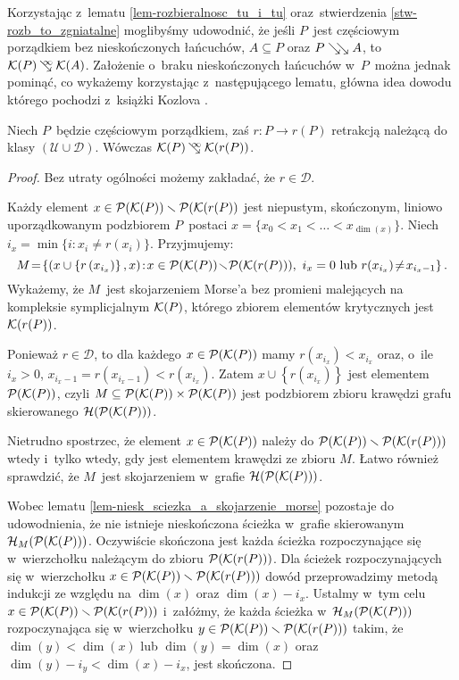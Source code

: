 Korzystając z~lematu \ref{lem-rozbieralnosc_tu_i_tu} oraz~stwierdzenia \ref{stw-rozb_to_zgniatalne} moglibyśmy udowodnić, że jeśli $P$~jest częściowym porządkiem bez nieskończonych łańcuchów, $A\subseteq P$ oraz \mbox{$P\searrow\!\!\searrow A$}, to $\mK(P)\infcoll \mK(A)$. Założenie o~braku nieskończonych łańcuchów w~$P$~można jednak pominąć, co wykażemy korzystając z~następującego lematu, główna idea dowodu którego pochodzi z~książki Kozlova \cite{Kozlov08}.

\begin{lem}\label{lem-kozlova_rozbieralnosc_implikuje_zgniatalnosc}
Niech $P$~będzie częściowym porządkiem, zaś $r\colon P\to r(P)$ retrakcją należącą do klasy $(\mathcal{U}\cup\mathcal{D})$. Wówczas $\mK(P)\infcoll \mK(r(P))$.
\end{lem}
\begin{proof}
Bez utraty ogólności możemy zakładać, że $r\in \mathcal{D}$.

Każdy element $x\in\mathcal{P}(\mathcal{K}(P))\smallsetminus \mathcal{P}(\mathcal{K}(r(P))$ jest niepustym, skończonym, liniowo uporządkowanym podzbiorem $P$~postaci $x=\bigl\{x_0<x_1<\ldots <x_{\dim(x)}\bigr\}$. Niech $i_x=\min\{i:x_i\not=r(x_i)\}$. Przyjmujemy:
\[M\!=\!\left\{\left(x\cup \left\{r\left(x_{i_x}\right)\right\},x\right)\!:\!x\in\mP(\mK(P))\!\smallsetminus\!\mP(\mK(r(P))),\ i_x=0 \text{ lub }r(x_{i_x})\!\not=\!x_{i_x-1}\right\}.\]
Wykażemy, że $M$~jest skojarzeniem Morse'a bez promieni malejących na kompleksie symplicjalnym $\mathcal{K}(P)$, którego zbiorem elementów krytycznych jest $\mathcal{K}(r(P))$.

Ponieważ $r\in\mathcal{D}$, to dla każdego $x\in\mathcal{P}(\mathcal{K}(P))$ mamy $r\left(x_{i_x}\right)<x_{i_x}$ oraz, o~ile $i_x>0$, $x_{i_x-1}=r\left(x_{i_x-1}\right)<r\left(x_{i_x}\right)$. Zatem $x\cup\left\{r\left(x_{i_x}\right)\right\}$ jest elementem $\mathcal{P}(\mathcal{K}(P))$, czyli $M\subseteq \mathcal{P}(\mathcal{K}(P))\times \mathcal{P}(\mathcal{K}(P))$ jest podzbiorem zbioru krawędzi grafu skierowanego $\mathcal{H}(\mathcal{P}(\mathcal{K}(P)))$.

Nietrudno spostrzec, że element $x\in \mathcal{P}(\mathcal{K}(P))$ należy do \mbox{$\mathcal{P}(\mathcal{K}(P))\smallsetminus \mathcal{P}(\mathcal{K}(r(P)))$} wtedy i~tylko wtedy, gdy jest elementem krawędzi ze zbioru $M$. Łatwo również sprawdzić, że $M$~jest skojarzeniem w~grafie $\mathcal{H}(\mathcal{P}(\mathcal{K}(P)))$.

Wobec lematu \ref{lem-niesk_sciezka_a_skojarzenie_morse} pozostaje do udowodnienia, że nie istnieje nieskończona ścieżka w~grafie skierowanym $\mathcal{H}_M(\mathcal{P}(\mathcal{K}(P)))$. Oczywiście skończona jest każda ścieżka rozpoczynające się w~wierzchołku należącym do zbioru $\mathcal{P}(\mathcal{K}(r(P)))$. Dla ścieżek rozpoczynających się w~wierzchołku $x\in\mathcal{P}(\mathcal{K}(P))\smallsetminus\mathcal{P}(\mathcal{K}(r(P)))$ dowód przeprowadzimy metodą indukcji ze względu na $\dim(x)$ oraz $\dim(x)-i_x$. Ustalmy w~tym celu $x\in\mathcal{P}(\mathcal{K}(P))\smallsetminus\mathcal{P}(\mathcal{K}(r(P)))$ i~załóżmy, że każda ścieżka w~$\mathcal{H}_M(\mathcal{P}(\mathcal{K}(P)))$ rozpoczynająca się w~wierzchołku $y\in \mathcal{P}(\mathcal{K}(P))\smallsetminus\mathcal{P}(\mathcal{K}(r(P)))$ takim, że $\dim(y)<\dim(x)$ lub $\dim(y)=\dim(x)$ oraz $\dim(y)-i_y<\dim(x)-i_x$, jest skończona.


\end{proof}
